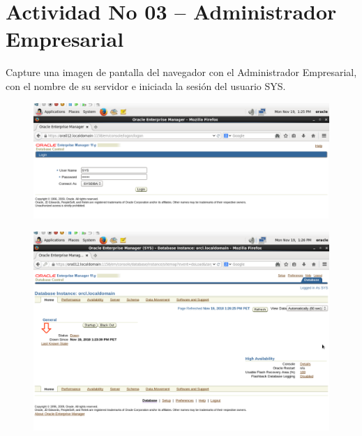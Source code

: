 \section{Actividad No 03 – Administrador Empresarial} 
Capture una imagen de pantalla del navegador con el Administrador Empresarial, con el nombre de su servidor e iniciada la sesión del usuario SYS.

\begin{figure}[htb]
\begin{center}
\includegraphics[width=15cm]{./Imagenes/1}
\end{center}
\end{figure}

\begin{figure}[htb]
\begin{center}
\includegraphics[width=15cm]{./Imagenes/2}
\end{center}
\end{figure}



